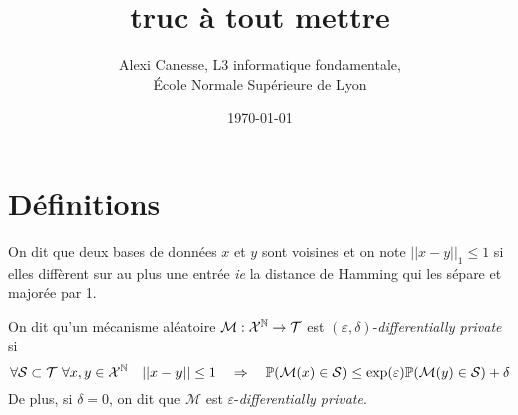 
\usepackage{tkz-base}
\usepackage{algorithm}
\usepackage{algorithmic}
\setlength\parindent{0pt}





\title{truc à tout mettre}           
\author{Alexi Canesse, L3 informatique fondamentale,\\École Normale Supérieure de Lyon}
\date{\today}          

\sloppy                  

\pgfplotsset{compat=1.16}






\section{Définitions}


On dit que deux bases de données \(x\) et \(y\) sont voisines et on note \(||x - y||_1 \leq 1\) si elles diffèrent sur au plus une entrée \textit{ie} la distance de {\sc Hamming} qui les sépare et majorée par 1.\\


On dit qu'un mécanisme aléatoire \(\mathcal M : \mathcal X^{\mathbb{N}} \to \mathcal T\) est \((\varepsilon, \delta)\)-\textit{differentially private} si 
\[
    \forall \mathcal S \subset \mathcal T \ \forall x,y \in \mathcal X^{\mathbb{N}} \quad ||x - y|| \leq 1 \quad \Rightarrow \quad \mathbb P(\mathcal M(x) \in \mathcal S) \leq \exp(\varepsilon)  \mathbb P(\mathcal M(y) \in \mathcal S) + \delta
\] 
De plus, si \(\delta = 0\), on dit que \(\mathcal M\) est \(\varepsilon\)-\textit{differentially private}.


